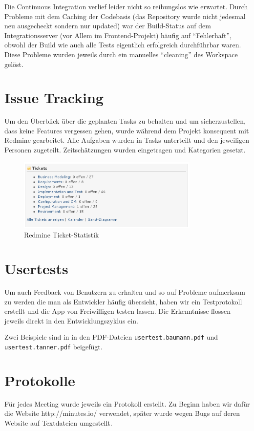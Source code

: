 \documentclass[10pt,a4paper]{scrartcl}
\begin{document}
Die Continuous Integration verlief leider nicht so reibungslos wie erwartet. Durch Probleme mit dem
Caching der Codebasis (das Repository wurde nicht jedesmal neu ausgecheckt sondern nur updated) war
der Build-Status auf dem Integrationsserver (vor Allem im Frontend-Projekt) häufig auf "`Fehlerhaft"',
obwohl der Build wie auch alle Tests eigentlich erfolgreich durchführbar waren. Diese Probleme
wurden jeweils durch ein manuelles "`cleaning"' des Workspace gelöst.

\section{Issue Tracking}

Um den Überblick über die geplanten Tasks zu behalten und um sicherzustellen, dass keine Features
vergessen gehen, wurde während dem Projekt konsequent mit Redmine gearbeitet. Alle Aufgaben wurden
in Tasks unterteilt und den jeweiligen Personen zugeteilt. Zeitschätzungen wurden eingetragen und
Kategorien gesetzt.

\begin{figure}[H]
	\begin{center}
		\includegraphics[width=0.8\textwidth]{img/redmine.png}
	\end{center}
	\caption{Redmine Ticket-Statistik}
\end{figure}

\section{Usertests}

Um auch Feedback von Benutzern zu erhalten und so auf Probleme aufmerksam zu werden die man als
Entwickler häufig übersieht, haben wir ein Testprotokoll erstellt und die App von Freiwilligen
testen lassen. Die Erkenntnisse flossen jeweils direkt in den Entwicklungszyklus ein.

Zwei Beispiele sind in in den PDF-Dateien \texttt{usertest.\-baumann.\-pdf} und
\texttt{usertest.\-tanner.\-pdf} beigefügt.

\section{Protokolle}

Für jedes Meeting wurde jeweils ein Protokoll erstellt. Zu Beginn haben wir dafür die Website
http://minutes.io/ verwendet, später wurde wegen Bugs auf deren Website auf Textdateien
umgestellt.




\end{document}
